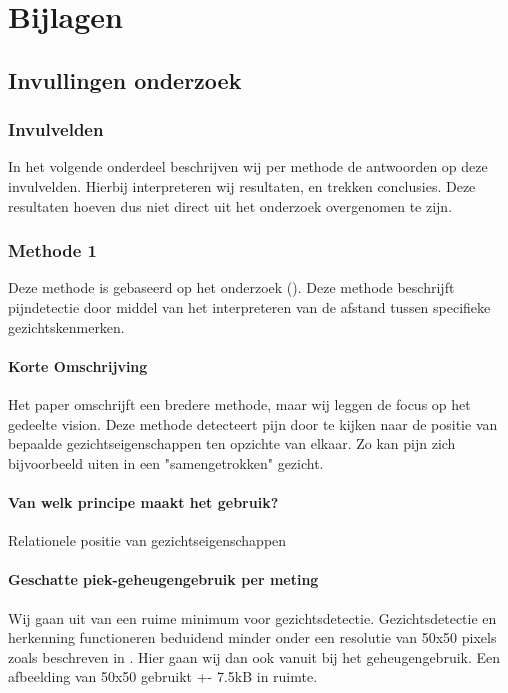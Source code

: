 \documentclass[11pt]{article}
\begin{document}
    \section{Bijlagen}\label{sec:bijlagen}

    \subsection{Invullingen onderzoek}\label{subsec:invullingen-onderzoek}
    \subsubsection{Invulvelden}
    In het volgende onderdeel beschrijven wij per methode de antwoorden op deze invulvelden.
    Hierbij interpreteren wij resultaten, en trekken conclusies.
    Deze resultaten hoeven dus niet direct uit het onderzoek overgenomen te zijn.

    \subsubsection{Methode 1}
    Deze methode is gebaseerd op het onderzoek (\citet{werner2014automatic}).
    Deze methode beschrijft pijndetectie door middel van het interpreteren van de afstand tussen specifieke gezichtskenmerken.

    \paragraph{Korte Omschrijving}
    Het paper omschrijft een bredere methode, maar wij leggen de focus op het gedeelte vision.
    Deze methode detecteert pijn door te kijken naar de positie van bepaalde gezichtseigenschappen ten opzichte van elkaar.
    Zo kan pijn zich bijvoorbeeld uiten in een "samengetrokken" gezicht.

    \paragraph{Van welk principe maakt het gebruik?}
    Relationele positie van gezichtseigenschappen

    \paragraph{Geschatte piek-geheugengebruik per meting}
    Wij gaan uit van een ruime minimum voor gezichtsdetectie.
    Gezichtsdetectie en herkenning functioneren beduidend minder onder een resolutie van 50x50 pixels zoals beschreven in \citet{boom2006effect}.
    Hier gaan wij dan ook vanuit bij het geheugengebruik.
    Een afbeelding van 50x50 gebruikt +- 7.5kB in ruimte.
\end{document}
